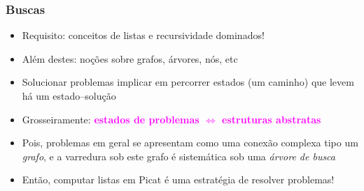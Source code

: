 \begin{frame}

    \frametitle{Buscas}

   \begin{block}{}
     \begin{itemize}
      \item Requisito: conceitos de listas e recursividade  dominados!
       \pause
      \item Além destes: noções sobre grafos, árvores, nós, etc

       \pause
      \item Solucionar problemas implicar em percorrer estados (um caminho)
      que levem há um estado--solução      
      
       \pause
      \item Grosseiramente: \textbf{\textcolor{magenta}{estados de problemas $\Leftrightarrow$ estruturas abstratas}}
         
       \pause
      \item Pois, problemas em geral
      se apresentam como uma conexão complexa tipo um \textit{grafo},
      e a varredura sob este grafo é sistemática
      sob uma \textit{árvore de busca}
      \pause
      
     \item Então, computar listas em Picat é uma estratégia
     de resolver problemas!

    \end{itemize}
    
    \end{block}
    
\end{frame}




